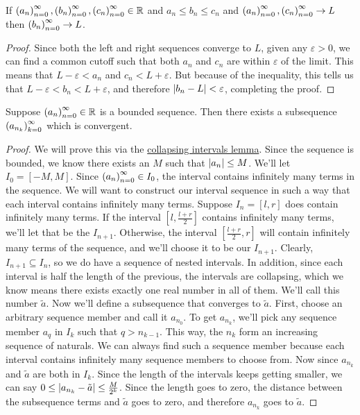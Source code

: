 \begin{theorem}
If $\seq{a},\seq{b},\seq{c} \in \R$ and $a_n \leq b_n \leq c_n$ and $\seq{a}, \seq{c} \to L$ then $\seq{b} \to L$.
\end{theorem}
\begin{proof}
Since both the left and right sequences converge to $L$, given any $\varepsilon > 0$, we can find a common cutoff such that both $a_n$ and $c_n$ are within $\varepsilon$ of the limit. This means that $L-\varepsilon < a_n$ and $c_n < L+\varepsilon$. But because of the inequality, this tells us that $L-\varepsilon < b_n < L+\varepsilon$, and therefore $\left\lvert b_n - L \right\rvert < \varepsilon$, completing the proof.
\end{proof}
\begin{theorem}
Suppose $\seq{a} \in \R$ is a bounded sequence. Then there exists a subsequence $\seq{a}[n_k][k]$ which is convergent. 
\end{theorem}
\begin{proof}
We will prove this via the \hyperlink{Collapsing Intervals Lemma}{collapsing intervals lemma}. Since the sequence is bounded, we know there exists an $M$ such that $\left\lvert a_n \right\rvert \leq M$. We'll let $I_0 = [-M, M]$. Since $\seq{a} \in I_0$, the interval contains infinitely many terms in the sequence. We will want to construct our interval sequence in such a way that each interval contains infinitely many terms. Suppose $I_n = [l, r]$ does contain infinitely many terms. If the interval $[l, \frac{l+r}{2}]$ contains infinitely many terms, we'll let that be the $I_{n+1}$. Otherwise, the interval $[\frac{l+r}{2}, r]$ will contain infinitely many terms of the sequence, and we'll choose it to be our $I_{n+1}$. Clearly, $I_{n+1} \subseteq I_n$, so we do have a sequence of nested intervals. In addition, since each interval is half the length of the previous, the intervals are collapsing, which we know means there exists exactly one real number in all of them. We'll call this number $\tilde{a}$. Now we'll define a subsequence that converges to $\tilde{a}$.
First, choose an arbitrary sequence member and call it $a_{n_0}$. To get $a_{n_k}$, we'll pick any sequence member $a_q$ in $I_k$ such that $q > n_{k-1}$. This way, the $n_k$ form an increasing sequence of naturals. We can always find such a sequence member because each interval contains infinitely many sequence members to choose from. Now since $a_{n_k}$ and $\tilde{a}$ are both in $I_k$. Since the length of the intervals keeps getting smaller, we can say $0 \leq \left\lvert a_{n_k} - \tilde{a} \right\rvert \leq \frac{M}{2^k}$. Since the length goes to zero, the distance between the subsequence terms and $\tilde{a}$ goes to zero, and therefore $a_{n_k}$ goes to $\tilde{a}$.
\end{proof}
